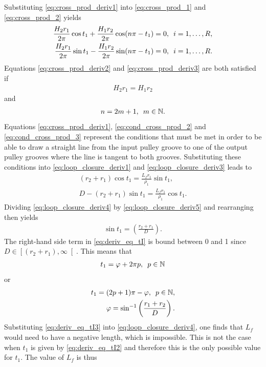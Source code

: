 \documentclass[10pt,cleanfoot]{asme2ej}
\newcommand{\hquad}{\hspace{0.5em}}
\begin{document}
Substituting \eqref{eq:cross_prod_deriv1} into \eqref{eq:cross_prod_1} and \eqref{eq:cross_prod_2} yields
\begin{align}
    \frac{H_2r_1}{2\pi}\cos t_1 + \frac{H_1r_2}{2\pi}\cos(n\pi-t_1)=0,\hquad i=1,\ldots ,R,\label{eq:cross_prod_deriv2}\\
    \frac{H_2r_1}{2\pi}\sin t_1-\frac{H_1r_2}{2\pi}\sin( n\pi-t_1)=0,\label{eq:cross_prod_deriv3}\hquad i=1 ,\ldots , R.
\end{align}
Equations \eqref{eq:cross_prod_deriv2} and \eqref{eq:cross_prod_deriv3} are both satisfied if 
\begin{align}
    H_2r_1 = H_1r_2\label{eq:cond_cross_prod_2}
\end{align} 
and 
\begin{align}
    n = 2m+1, \hquad m \in \mathbb{N}.\label{eq:cond_cross_prod_3}
\end{align}
Equations \eqref{eq:cross_prod_deriv1}, \eqref{eq:cond_cross_prod_2} and \eqref{eq:cond_cross_prod_3} represent the conditions that must be met in order to be able to draw a straight line from the input pulley groove to one of the output pulley grooves where the line is tangent to both grooves. Substituting these conditions into \eqref{eq:loop_closure_deriv1} and \eqref{eq:loop_closure_deriv3} leads to
\begin{align}
    (r_2+r_1)\cos t_1 = \frac{L_fr_1}{\rho_1}\sin t_1,\label{eq:loop_closure_deriv4}\\
    D - \left(r_2+r_1\right)\sin t_1 = \frac{L_fr_1}{\rho_1}\cos t_1.\label{eq:loop_closure_deriv5}
\end{align}
Dividing  \eqref{eq:loop_closure_deriv4} by \eqref{eq:loop_closure_deriv5} and rearranging then yields
\begin{align}
   \sin t_1 = \left(\frac{r_2+r_1}{D}\right).\label{eq:deriv_eq_tI}
\end{align}
The right-hand side term in \eqref{eq:deriv_eq_tI} is bound between 0 and 1 since $D\in\left[(r_2+r_1),\infty \right[$. This means that 
\begin{align}
    t_1 =  \varphi + 2\pi p,\hquad p \in \mathbb{N}\label{eq:deriv_eq_tI2}
\end{align}
or 
\begin{align}
    t_1 =(2p+1)\pi-\varphi,\hquad p \in \mathbb{N},\label{eq:deriv_eq_tI3}\\
    \varphi = \sin^{-1}\left(\frac{r_1+r_2}{D}\right).
\end{align}
Substituting \eqref{eq:deriv_eq_tI3} into \eqref{eq:loop_closure_deriv4}, one finds that $L_f$ would need to have a negative length, which is impossible. This is not the case when $t_1$ is given by \eqref{eq:deriv_eq_tI2} and therefore this is the only possible value for $t_1$. The value of $L_f$ is thus
\end{document}
